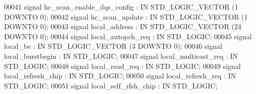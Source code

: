 \begin{DoxyCode}
00041                  \textcolor{keywordflow}{signal} \textcolor{vhdlchar}{hc_scan_enable_dqs_config} \textcolor{vhdlchar}{:} \textcolor{keywordflow}{IN} \textcolor{comment}{STD\_LOGIC\_VECTOR} \textcolor{vhdlchar}{(}\textcolor{vhdllogic}{}\textcolor{vhdllogic}{1} \textcolor{keywordflow}{DOWNTO} \textcolor{vhdllogic}{}\textcolor{vhdllogic}{0}\textcolor{vhdlchar}{)};
00042                  \textcolor{keywordflow}{signal} \textcolor{vhdlchar}{hc_scan_update} \textcolor{vhdlchar}{:} \textcolor{keywordflow}{IN} \textcolor{comment}{STD\_LOGIC\_VECTOR} \textcolor{vhdlchar}{(}\textcolor{vhdllogic}{}\textcolor{vhdllogic}{1} \textcolor{keywordflow}{DOWNTO} \textcolor{vhdllogic}{}\textcolor{vhdllogic}{0}\textcolor{vhdlchar}{)};
00043                  \textcolor{keywordflow}{signal} \textcolor{vhdlchar}{local_address} \textcolor{vhdlchar}{:} \textcolor{keywordflow}{IN} \textcolor{comment}{STD\_LOGIC\_VECTOR} \textcolor{vhdlchar}{(}\textcolor{vhdllogic}{}\textcolor{vhdllogic}{24} \textcolor{keywordflow}{DOWNTO} \textcolor{vhdllogic}{}\textcolor{vhdllogic}{0}\textcolor{vhdlchar}{)};
00044                  \textcolor{keywordflow}{signal} \textcolor{vhdlchar}{local_autopch_req} \textcolor{vhdlchar}{:} \textcolor{keywordflow}{IN} \textcolor{comment}{STD\_LOGIC};
00045                  \textcolor{keywordflow}{signal} \textcolor{vhdlchar}{local_be} \textcolor{vhdlchar}{:} \textcolor{keywordflow}{IN} \textcolor{comment}{STD\_LOGIC\_VECTOR} \textcolor{vhdlchar}{(}\textcolor{vhdllogic}{}\textcolor{vhdllogic}{3} \textcolor{keywordflow}{DOWNTO} \textcolor{vhdllogic}{}\textcolor{vhdllogic}{0}\textcolor{vhdlchar}{)};
00046                  \textcolor{keywordflow}{signal} \textcolor{vhdlchar}{local_burstbegin} \textcolor{vhdlchar}{:} \textcolor{keywordflow}{IN} \textcolor{comment}{STD\_LOGIC};
00047                  \textcolor{keywordflow}{signal} \textcolor{vhdlchar}{local_multicast_req} \textcolor{vhdlchar}{:} \textcolor{keywordflow}{IN} \textcolor{comment}{STD\_LOGIC};
00048                  \textcolor{keywordflow}{signal} \textcolor{vhdlchar}{local_read_req} \textcolor{vhdlchar}{:} \textcolor{keywordflow}{IN} \textcolor{comment}{STD\_LOGIC};
00049                  \textcolor{keywordflow}{signal} \textcolor{vhdlchar}{local_refresh_chip} \textcolor{vhdlchar}{:} \textcolor{keywordflow}{IN} \textcolor{comment}{STD\_LOGIC};
00050                  \textcolor{keywordflow}{signal} \textcolor{vhdlchar}{local_refresh_req} \textcolor{vhdlchar}{:} \textcolor{keywordflow}{IN} \textcolor{comment}{STD\_LOGIC};
00051                  \textcolor{keywordflow}{signal} \textcolor{vhdlchar}{local_self_rfsh_chip} \textcolor{vhdlchar}{:} \textcolor{keywordflow}{IN} \textcolor{comment}{STD\_LOGIC};

\end{DoxyCode}
